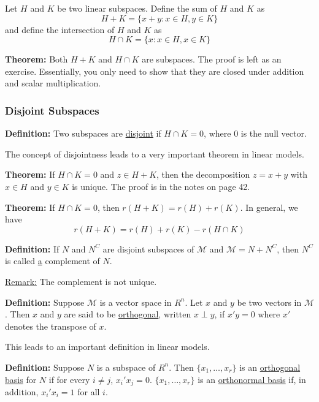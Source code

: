 \documentclass[12pt]{article}
\numberwithin{equation}{section}
\begin{document}
Let $H$ and $K$ be two linear subspaces. Define the sum of $H$ and $K$ as 
\begin{equation*}
  H + K = \{x + y : x \in H, y \in K \}
\end{equation*}
%
and define the intersection of $H$ and $K$ as 
\begin{equation*}
  H \cap K = \{x: x \in H, x \in K \}
\end{equation*}

\textbf{Theorem:} Both $H + K$ and $H \cap K$ are subspaces. The proof is left as an exercise. Essentially, you only need to show that they are closed under addition and scalar multiplication.

\subsubsection{Disjoint Subspaces}
\textbf{Definition:} Two subspaces are \underline{disjoint} if $H \cap K = 0$, where 0 is the null vector. 

The concept of disjointness leads to a very important theorem in linear models.

\textbf{Theorem:} If $H \cap K = 0$ and $z \in H + K$, then the decomposition $z = x + y$ with $x \in H$ and $y \in K$ is unique. The proof is in the notes on page 42.

\textbf{Theorem:} If $H \cap K = 0$, then $r(H + K) = r(H) + r(K)$. In general, we have
%
\begin{equation*}
  r(H + K) = r(H) + r(K) - r(H \cap K)
\end{equation*}

\textbf{Definition:} If $N$ and $N^C$ are disjoint subspaces of $\mathcal{M}$ and $\mathcal{M} = N + N^C$, then $N^C$ is called \underline{a} complement of $N$.

\underline{Remark:} The complement is not unique.

\textbf{Definition:} Suppose $\mathcal{M}$ is a vector space in $R^n$. Let $x$ and $y$ be two vectors in $\mathcal{M}$. Then $x$ and $y$ are said to be \underline{orthogonal}, written $x \perp y$, if $x'y = 0$ where $x'$ denotes the transpose of $x$.

This leads to an important definition in linear models.

\textbf{Definition:} Suppose $N$ is a subspace of $R^n$. Then 
$\{x_1, \ldots, x_r \}$ is an \underline{orthogonal basis} for $N$ if for every $i \ne j$, $x_i' x_j = 0$. $\{x_1, \ldots, x_r\}$ is an \underline{orthonormal basis} if, in addition, $x_i' x_i = 1$ for all $i$.
\end{document}
